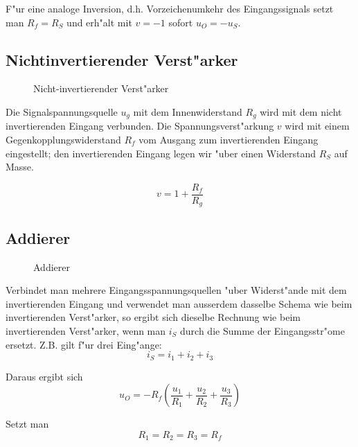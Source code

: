 \documentclass[german, 10pt, a4paper, headsepline]{scrreprt}
\theoremstyle{remark}
\begin{document}
F"ur eine analoge Inversion, d.h. Vorzeichenumkehr des Eingangssignals setzt man $R_f = R_S$ und erh"alt mit $v = -1$ sofort $u_O = - u_S$.

\subsection{Nichtinvertierender Verst"arker}

\begin{figure}[hbt]
 
 \centerline{\box\graph}
 \caption{Nicht-invertierender Verst"arker}
 \label{opamp_ninvverst}
\end{figure}

Die Signalspannungsquelle $u_g$ mit dem Innenwiderstand $R_g$ wird mit dem nicht invertierenden Eingang verbunden. Die Spannungsverst"arkung $v$ wird mit einem Gegenkopplungswiderstand $R_f$ vom Ausgang zum invertierenden Eingang eingestellt; den invertierenden Eingang legen wir "uber einen Widerstand $R_S$ auf Masse.

\begin{displaymath}
	v = 1 + \frac{R_f}{R_g}
\end{displaymath}

\subsection{Addierer}

\begin{figure}[hbt]
 
 \centerline{\box\graph}
 \caption{Addierer}
 \label{opamp_addierer}
\end{figure}

Verbindet man mehrere Eingangsspannungsquellen "uber Widerst"ande mit dem invertierenden Eingang und verwendet man ausserdem dasselbe Schema wie beim invertierenden Verst"arker, so ergibt sich dieselbe Rechnung wie beim invertierenden Verst"arker, wenn man $i_S$ durch die Summe der Eingangsstr"ome ersetzt. Z.B. gilt f"ur drei Eing"ange:
\begin{displaymath}
	i_S = i_1 + i_2 + i_3
\end{displaymath}

Daraus ergibt sich
\begin{displaymath}
	u_O = - R_f \left (\frac{u_1}{R_1}+ \frac{u_2}{R_2}+ \frac{u_3}{R_3} \right )
\end{displaymath}

Setzt man
\begin{displaymath}
	R_1 = R_2 = R_3 = R_f
\end{displaymath}
\end{document}
